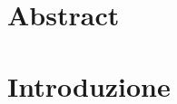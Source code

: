 \documentclass[12pt,oneside]{report}
\begin{document}
 
	                
	\begin{titlepage}
		
	\end{titlepage} 
    
  
    
	\chapter*{Abstract}
	
    \tableofcontents{}
    \newpage
    \chapter{Introduzione}
    \newpage
     
    
\end{document}

